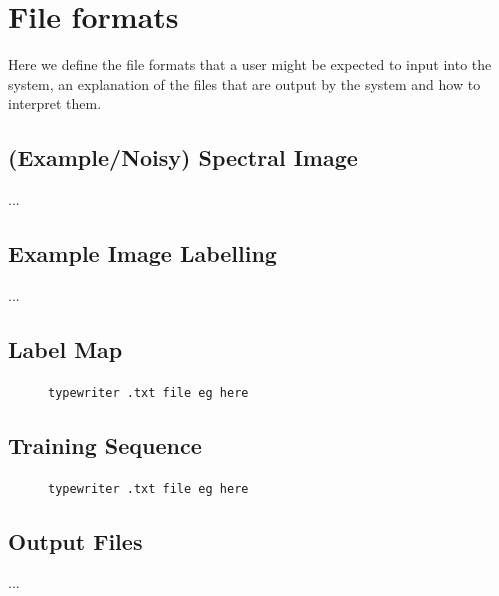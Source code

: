 \documentclass[12pt,twoside,notitlepage]{report}
\begin{document}
\appendix


\cleardoublepage
\chapter{File formats}    \label{app:file_formats}
    Here we define the file formats that a user might be expected to input into the system, an explanation of the 
    files that are output by the system and how to interpret them.

    \section{(Example/Noisy) Spectral Image}
        ...


    \section{Example Image Labelling}
        ...
    
    \section{Label Map}
        \begin{figure}[H]
            \begin{framed}
                {\tt typewriter .txt file eg here }
            \end{framed}
        \end{figure}

    \section{Training Sequence}
        \begin{figure}[H]
            \begin{framed}
                {\tt typewriter .txt file eg here }
            \end{framed}
        \end{figure}

    \section{Output Files}
        ...
\end{document}
